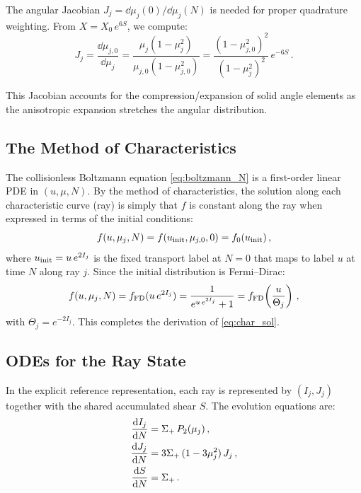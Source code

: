 The angular Jacobian $J_j = \dd\mu_j(0)/\dd\mu_j(N)$ is needed for proper quadrature weighting.  From $X = X_0\,e^{6S}$, we compute:
\begin{equation}
J_j = \frac{\dd\mu_{j,0}}{\dd\mu_j} = \frac{\mu_j(1-\mu_j^2)}{\mu_{j,0}(1-\mu_{j,0}^2)} = \frac{(1-\mu_{j,0}^2)^2}{(1-\mu_j^2)^2}\,e^{-6S}\,.
\end{equation}

This Jacobian accounts for the compression/expansion of solid angle elements as the anisotropic expansion stretches the angular distribution.

\subsection{The Method of Characteristics}

The collisionless Boltzmann equation \eqref{eq:boltzmann_N} is a first-order linear PDE in $(u, \mu, N)$.  By the method of characteristics, the solution along each characteristic curve (ray) is simply that $f$ is constant along the ray when expressed in terms of the initial conditions:
\begin{equation}
f(u, \mu_j, N) = f(u_{\rm init}, \mu_{j,0}, 0) = f_0(u_{\rm init})\,,
\end{equation}
where $u_{\rm init} = u\,e^{2I_j}$ is the fixed transport label at $N = 0$ that maps to label $u$ at time $N$ along ray $j$.  Since the initial distribution is Fermi--Dirac:
\begin{equation}
f(u, \mu_j, N) = f_{\rm FD}(u\,e^{2I_j}) = \frac{1}{e^{u\,e^{2I_j}} + 1} = f_{\rm FD}\!\left(\frac{u}{\Theta_j}\right)\,,
\end{equation}
with $\Theta_j = e^{-2I_j}$.  This completes the derivation of \eqref{eq:char_sol}.

\subsection{ODEs for the Ray State}

In the explicit reference representation, each ray is represented by $(I_j, J_j)$ together with the shared accumulated shear $S$.  The evolution equations are:
\begin{align}
\frac{\mathrm{d} I_j}{\mathrm{d} N} &= \Sigma_+\,P_2(\mu_j)\,,\\
\frac{\mathrm{d} J_j}{\mathrm{d} N} &= 3\Sigma_+\,(1-3\mu_j^2)\,J_j\,,\\
\frac{\mathrm{d} S}{\mathrm{d} N} &= \Sigma_+\,.
\end{align}

